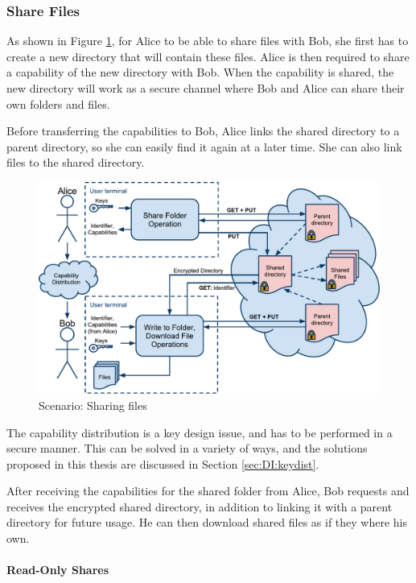 \documentclass[pdftex,english,10pt,b5paper,twoside]{book}
\begin{document}
\subsubsection{Share Files}

As shown in Figure \ref{fig:AS:sharing}, for Alice to be able to share files
with Bob, she first has to create a new directory that will contain these
files. Alice is then required to share a capability of the new directory with
Bob. When the capability is shared, the new directory will work as a secure
channel where Bob and Alice can share their own folders and files.

Before transferring the capabilities to Bob, Alice links the shared directory to
a parent directory, so she can easily find it again at a later time. She can
also link files to the shared directory.

\begin{figure}[h!]
    \centering
    \includegraphics[width=\columnwidth]{ArchitectureShare.pdf}
    \caption{Scenario: Sharing files}
    \label{fig:AS:sharing}
\end{figure}

The capability distribution is a key design issue, and has to be performed in a
secure manner. This can be solved in a variety of ways, and the solutions
proposed in this thesis are discussed in Section \ref{sec:DI:keydist}.

After receiving the capabilities for the shared folder from Alice, Bob requests
and receives the encrypted shared directory, in addition to linking it with a
parent directory for future usage. He can then download shared files as if they
where his own.

\paragraph{Read-Only Shares}
\end{document}
